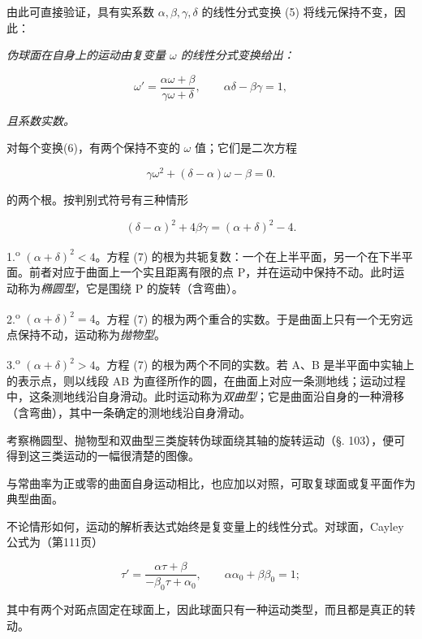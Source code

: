 由此可直接验证，具有实系数 $\alpha,\beta,\gamma,\delta$ 的线性分式变换 (5) 将线元保持不变，因此：



\emph{伪球面在自身上的运动由复变量 $\omega$ 的线性分式变换给出：}

\[
\tag{6}
 \omega'=\frac{\alpha\omega+\beta}{\gamma\omega+\delta},\qquad
 \alpha\delta-\beta\gamma=1,
\]

\emph{且系数实数。}



对每个变换(6)，有两个保持不变的 \(\omega\) 值；它们是二次方程

\[
\tag{7}
 \gamma\omega^2+(\delta-\alpha)\omega-\beta=0.
\]

的两个根。按判别式符号有三种情形

\[
(\delta-\alpha)^2+4\beta\gamma=(\alpha+\delta)^2-4.
\]

1.\textsuperscript{o} $(\alpha+\delta)^2<4$。方程 (7) 的根为共轭复数：一个在上半平面，另一个在下半平面。前者对应于曲面上一个实且距离有限的点 P，并在运动中保持不动。此时运动称为\emph{椭圆型}，它是围绕 P 的旋转（含弯曲）。



2.\textsuperscript{o} $(\alpha+\delta)^2=4$。方程 (7) 的根为两个重合的实数。于是曲面上只有一个无穷远点保持不动，运动称为\emph{抛物型}。



3.\textsuperscript{o} $(\alpha+\delta)^2>4$。方程 (7) 的根为两个不同的实数。若 A、B 是半平面中实轴上的表示点，则以线段 AB 为直径所作的圆，在曲面上对应一条测地线；运动过程中，这条测地线沿自身滑动。此时运动称为\emph{双曲型}；它是曲面沿自身的一种滑移（含弯曲），其中一条确定的测地线沿自身滑动。



考察椭圆型、抛物型和双曲型三类旋转伪球面绕其轴的旋转运动（§. 103），便可得到这三类运动的一幅很清楚的图像。



与常曲率为正或零的曲面自身运动相比，也应加以对照，可取复球面或复平面作为典型曲面。



不论情形如何，运动的解析表达式始终是复变量上的线性分式。对球面，Cayley 公式为（第111页）

\[
 \tau'=\frac{\alpha\tau+\beta}{-\beta_0\tau+\alpha_0},\qquad
 \alpha\alpha_0+\beta\beta_0=1;
\]

其中有两个对跖点固定在球面上，因此球面只有一种运动类型，而且都是真正的转动。



